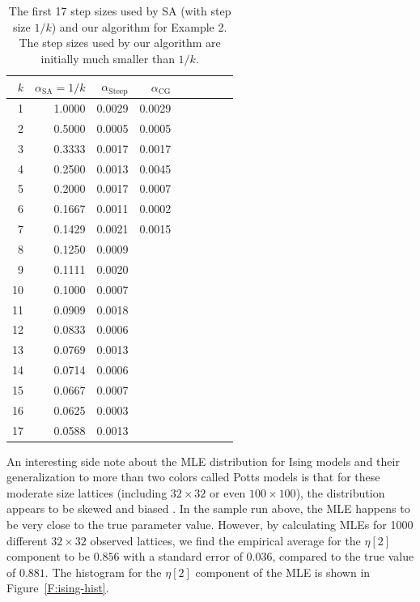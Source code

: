 \begin{table}[h!]
\caption[Comparisons of step sizes for SA and our algorithm for Ising model example]
{The first 17 step sizes used by SA (with step size $1/k$) and our algorithm 
for Example 2.  The step sizes 
used by our algorithm are initially much smaller than $1/k$.}
\begin{center}
\begin{tabular}{rrrrrrrrr}
  \hline
  $k$ & $\alpha_{\textrm{SA}} =1/k$  & $\alpha_{\textrm{Steep}}$ & $\alpha_{\textrm
{CG}}$ \\ 
  \hline
1	&	1.0000	&	0.0029	&	0.0029	\\
2	&	0.5000	&	0.0005	&	0.0005	\\
3	&	0.3333	&	0.0017	&	0.0017	\\
4	&	0.2500	&	0.0013	&	0.0045	\\
5	&	0.2000	&	0.0017	&	0.0007	\\
6	&	0.1667	&	0.0011	&	0.0002	\\
7	&	0.1429	&	0.0021	&	0.0015	\\
8	&	0.1250	&	0.0009	&		\\
9	&	0.1111	&	0.0020	&		\\
10	&	0.1000	&	0.0007	&		\\
11	&	0.0909	&	0.0018	&		\\
12	&	0.0833	&	0.0006	&		\\
13	&	0.0769	&	0.0013	&		\\
14	&	0.0714	&	0.0006	&		\\
15	&	0.0667	&	0.0007	&		\\
16	&	0.0625	&	0.0003	&		\\
17	&	0.0588	&	0.0013	&		\\
  \hline
\end{tabular}
\end{center}
\label{Table:Potts step size}
\end{table}

An interesting side note about the MLE distribution for Ising models
and their generalization to 
more than two colors called Potts models is that for these moderate size lattices (including
$32 \times 32$ or even $100 \times 100$), the distribution appears to be skewed and 
biased \citep{Composite}.  In the sample run above, the MLE happens to be very close 
to the true parameter value.  However, by calculating MLEs for 1000 different $32 \times 32$
observed lattices, we find the empirical average for the $\eta[2]$ component to be $0.856$ with a
standard error of 0.036, compared to the true value of $0.881$.  The histogram for the $\eta[2]$ component of the MLE 
is shown in Figure~\ref{F:ising-hist}. 

